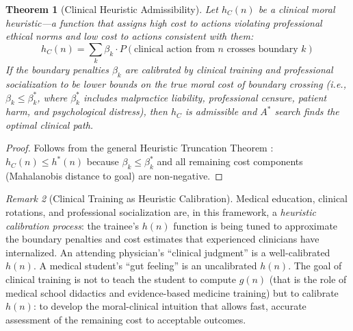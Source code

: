 \documentclass[12pt]{article}
\newtheorem{theorem}{Theorem}[section]
\theoremstyle{definition}
\theoremstyle{remark}
\newtheorem{remark}[theorem]{Remark}
\begin{document}
\begin{theorem}[Clinical Heuristic Admissibility]
\label{thm:clinical_admissibility}
Let $h_C(n)$ be a \emph{clinical moral heuristic}---a function that assigns high cost to actions violating professional ethical norms and low cost to actions consistent with them:
\begin{equation}
h_C(n) = \sum_{k} \beta_k \cdot P(\text{clinical action from } n \text{ crosses boundary } k)
\end{equation}
If the boundary penalties $\beta_k$ are calibrated by clinical training and professional socialization to be lower bounds on the true moral cost of boundary crossing (i.e., $\beta_k \leq \beta_k^*$, where $\beta_k^*$ includes malpractice liability, professional censure, patient harm, and psychological distress), then $h_C$ is admissible and $A^*$ search finds the optimal clinical path.
\end{theorem}

\begin{proof}
Follows from the general Heuristic Truncation Theorem \cite{bond2026geometric}: $h_C(n) \leq h^*(n)$ because $\beta_k \leq \beta_k^*$ and all remaining cost components (Mahalanobis distance to goal) are non-negative.
\end{proof}

\begin{remark}[Clinical Training as Heuristic Calibration]
Medical education, clinical rotations, and professional socialization are, in this framework, a \emph{heuristic calibration process}: the trainee's $h(n)$ function is being tuned to approximate the boundary penalties and cost estimates that experienced clinicians have internalized.  An attending physician's ``clinical judgment'' is a well-calibrated $h(n)$.  A medical student's ``gut feeling'' is an uncalibrated $h(n)$.  The goal of clinical training is not to teach the student to compute $g(n)$ (that is the role of medical school didactics and evidence-based medicine training) but to calibrate $h(n)$: to develop the moral-clinical intuition that allows fast, accurate assessment of the remaining cost to acceptable outcomes.
\end{remark}
\end{document}
